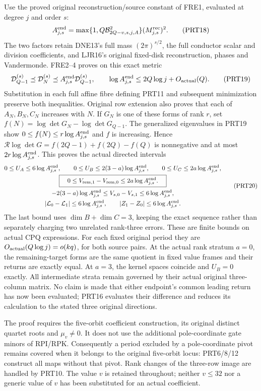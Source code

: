Use the proved original reconstruction/source constant of FRE1,
evaluated at degree $j$ and order $s$:
\[
 A_{j,s}^{\rm end}=
 \max\{1,Q\mathcal B_{2Q-v,s,j,A}^{2}\}
                    (M_{j,s}^{\rm rec})^2.
 \tag{PRT18}
\]
The two factors retain DNE13's full mass $(2\pi)^{s/2}$,
the full conductor scalar and division coefficients, and LJR16's
original fixed-disk reconstruction, phases and Vandermonde.
FRE2--4 proves on this exact metric
\[
 \mathcal D_{Q-1}^{(s)}\preceq\mathcal D_N^{(s)}
   \preceq A_{j,s}^{\rm end}\mathcal D_{Q-1}^{(s)},
 \qquad
 \log A_{j,s}^{\rm end}\le2Q\log j+O_{\rm actual}(Q).
 \tag{PRT19}
\]
Substitution in each full affine fibre defining PRT11 and subsequent
minimization preserve both inequalities. Original row extension also
proves that each of $A_N,B_N,C_N$ increases with $N$.
If $G_N$ is one of these forms of rank $r$, set
$f(N)=\log\det G_N-\log\det G_{Q-1}$.
The generalized eigenvalues in PRT19 show $0\le f(N)\le
r\log A_{j,s}^{\rm end}$ and $f$ is increasing. Hence
$\mathcal R\log\det G=f(2Q-1)+f(2Q)-f(Q)$ is nonnegative
and at most $2r\log A_{j,s}^{\rm end}$.
This proves the actual directed intervals
\[
 \begin{gathered}
 0\le U_A\le6\log A_{j,s}^{\rm end},\qquad
 0\le U_B\le2(3-a)\log A_{j,s}^{\rm end},\qquad
 0\le U_C\le2a\log A_{j,s}^{\rm end},\\
 \boxed{\quad0\le V_{{\rm rem},1}-V_{{\rm rem},0}
                   \le2a\log A_{j,s}^{\rm end}.\quad}\\
 -2(3-a)\log A_{j,s}^{\rm end}
 \le V_{s,0}-V_{s,1}\le6\log A_{j,s}^{\rm end},\\
 |\mathcal L_0-\mathcal L_1|\le6\log A_{j,s}^{\rm end},
 \qquad |Z_1-Z_0|\le6\log A_{j,s}^{\rm end}.
 \end{gathered}\tag{PRT20}
\]
The last bound uses $\dim B+\dim C=3$, keeping the exact
sequence rather than separately charging two unrelated rank-three
errors. These are finite bounds on actual CPQ expressions.
For each fixed original period they are
$O_{\rm actual}(Q\log j)=o(kq)$, for both source pairs.
At the actual rank stratum $a=0$, the remaining-target forms are
the same quotient in fixed value frames and their returns are exactly
equal. At $a=3$, the kernel spaces coincide and $U_B=0$ exactly.
All intermediate strata remain governed by their actual original
three-column matrix. No claim is made that either endpoint's common
leading return has now been evaluated; PRT16 evaluates their difference
and reduces its calculation to the stated three original directions.

The proof requires the five-orbit coefficient construction, its original
distinct quartet roots and $\mu_v\ne0$. It does not use the additional
pole-coordinate gate minors of RPI/RPK. Consequently a period excluded
by a pole-coordinate pivot remains covered when it belongs to the
original five-orbit locus: PRT6/8/12 construct all maps without that
pivot. Rank changes of the three-row image are handled by PRT10.
The value $v$ is retained throughout; neither $v\le32$ nor a generic
value of $v$ has been substituted for an actual coefficient.

\label{MPBUILD:PRT_CONNECTING_ENDPOINT_RETURN:end}
